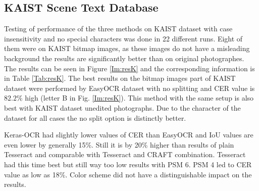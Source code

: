 \subsection*{KAIST Scene Text Database}

Testing of performance of the three methods on KAIST dataset with case insensitivity and no special characters was done in 22 different runs. Eight of them were on KAIST bitmap images, as these images do not have a misleading background the results are significantly better than on original photographes. The results can be seen in Figure \ref*{Im:resK} and the corresponding information is in Table \ref*{Tab:resK}. 
The best results on the bitmap images part of KAIST dataset were performed by EasyOCR dataset with no splitting and CER value is $82.2\%$ high (letter B in Fig. \ref*{Im:resK}). This method with the same setup is also best with KAIST dataset unedited photographs. Due to the character of the dataset for all cases the no split option is distinctly better. 

Keras-OCR had slightly lower values of CER than EasyOCR and IoU values are even lower by generally 15\%. Still it is by 20\% higher than results of plain Tesseract and comparable with Tesseract and CRAFT combination. Tesseract had this time best but still way too low results with PSM 6. PSM 4 led to CER value as low as 18\%. Color scheme did not have a distinguishable impact on the results.
 
